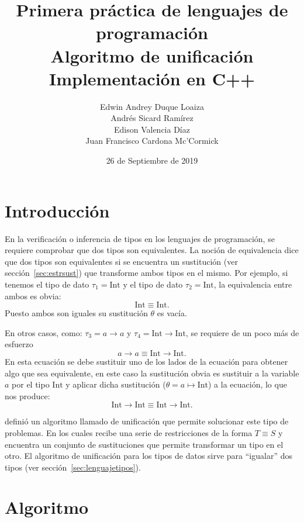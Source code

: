 \documentclass{article}
\title{Primera práctica de lenguajes de programación\\Algoritmo de unificación\\Implementación en C++}
\date{26 de Septiembre de 2019}
\author{Edwin Andrey Duque Loaiza\\Andrés Sicard Ramírez\\Edison Valencia Díaz\\Juan Francisco Cardona Mc'Cormick}
\theoremstyle{definition}
\begin{document}
\maketitle{}

\section{Introducción}
\label{sec:Introduccion}

En la verificación o inferencia de tipos en los lenguajes de
programación, se requiere comprobar que dos tipos son equivalentes. La
noción de equivalencia dice que dos tipos son equivalentes si se
encuentra un sustitución (ver sección~\ref{sec:estrsust}) que
transforme ambos tipos en el mismo. Por ejemplo, si tenemos el tipo de
dato $\tau_1 = \text{Int}$ y el tipo de dato $\tau_2 = \text{Int}$, la
equivalencia entre ambos es obvia:
\begin{equation*}
  \text{Int} \equiv \text{Int}.
\end{equation*}
Puesto ambos son iguales su sustitución $\theta$ es vacía.

En otros casos, como: $\tau_3 = a \to a$ y $\tau_4 = \text{Int}
\to \text{Int}$, se requiere de un poco más de esfuerzo
\begin{equation*}
  a \to a \equiv \text{Int} \to \text{Int}.
\end{equation*}
En esta ecuación se debe sustituir uno de los lados de la ecuación
para obtener algo que sea equivalente, en este caso la sustitución
obvia es sustituir a la variable $a$ por el tipo $\text{Int}$ y
aplicar dicha sustitución ($\theta = a \mapsto \text{Int}$) a la
ecuación, lo que nos produce:
\begin{equation*}
  \text{Int} \to \text{Int} \equiv \text{Int} \to \text{Int}.
\end{equation*}

\textcite{robinson-1971} definió un algoritmo llamado de unificación
que permite solucionar este tipo de problemas. En los cuales recibe
una serie de restricciones de la forma $T \equiv S$ y encuentra un
conjunto de sustituciones que permite transformar un tipo en el
otro. El algoritmo de unificación para los tipos de datos sirve para
``igualar'' dos tipos (ver sección~\ref{sec:lenguajetipos}).

\section{Algoritmo}\label{sec:algoritmo}
\end{document}
